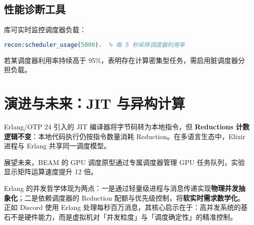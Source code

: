 \section{性能诊断工具}
 库可实时监控调度器负载：\par
\begin{lstlisting}[language=erlang]
recon:scheduler_usage(5000).  % 每 5 秒采样调度器利用率
\end{lstlisting}
若某调度器利用率持续高于 95\%{}，表明存在计算密集型任务，需启用脏调度器分担负载。\par
\chapter{演进与未来：JIT 与异构计算}
Erlang/OTP 24 引入的 JIT 编译器将字节码转为本地指令，但 \textbf{Reductions 计数逻辑不变}：本地代码执行仍按指令数量消耗 Reduction。在多语言生态中，Elixir 进程与 Erlang 共享同一调度模型。\par
展望未来，BEAM 的 GPU 调度原型通过专属调度器管理 GPU 任务队列，实验显示矩阵运算速度提升 12 倍。\par
Erlang 的并发哲学体现为两点：一是通过轻量级进程与消息传递实现\textbf{物理并发抽象化}；二是依赖调度器的 Reduction 配额与优先级控制，将\textbf{软实时需求数学化}。正如 Discord 使用 Erlang 处理每秒百万消息，其核心启示在于：高并发系统的基石不是硬件能力，而是虚拟机对「并发粒度」与「调度确定性」的精准控制。\par
